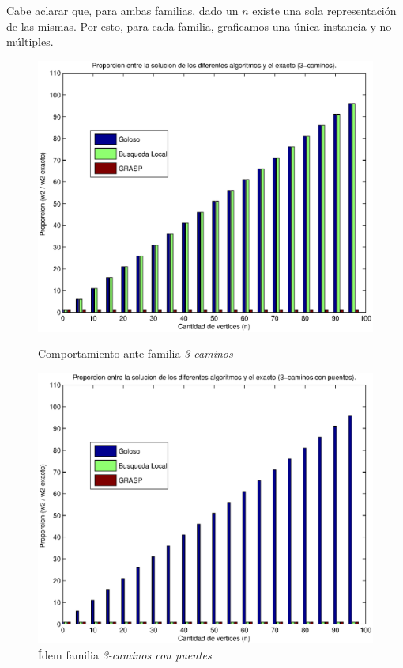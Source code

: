 Cabe aclarar que, para ambas familias, dado un $n$ existe una sola representación de las mismas. Por esto, para cada familia, graficamos una única instancia y no múltiples.

\begin{figure}[H]
    \begin{minipage}{0.5\linewidth}
      \includegraphics[width=\linewidth]{graficos/todos_proporcion_3caminos.eps}
      \caption{Comportamiento ante familia \emph{3-caminos}}\label{fig:comportamiento-familia-rompe}
    \end{minipage}
    \hfill
    \begin{minipage}{0.5\linewidth}
      \includegraphics[width=\linewidth]{graficos/todos_proporcion_puentes.eps}
      \caption{Ídem familia \emph{3-caminos con puentes}}\label{fig:comportamiento-familia-puente}
    \end{minipage}    
\end{figure}

